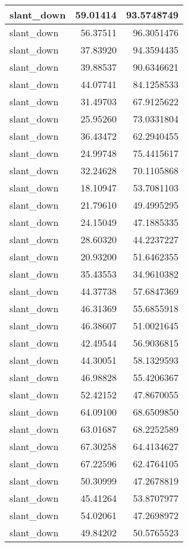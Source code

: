 \documentclass[
]{book}
\theoremstyle{definition}
\theoremstyle{definition}
\theoremstyle{definition}
\theoremstyle{definition}
\theoremstyle{remark}
\begin{document}
\begin{tabular}{l|r|r}
\hline
slant\_down & 59.01414 & 93.5748749\\
\hline
slant\_down & 56.37511 & 96.3051476\\
\hline
slant\_down & 37.83920 & 94.3594435\\
\hline
slant\_down & 39.88537 & 90.6346621\\
\hline
slant\_down & 44.07741 & 84.1258533\\
\hline
slant\_down & 31.49703 & 67.9125622\\
\hline
slant\_down & 25.95260 & 73.0331804\\
\hline
slant\_down & 36.43472 & 62.2940455\\
\hline
slant\_down & 24.99748 & 75.4415617\\
\hline
slant\_down & 32.24628 & 70.1105868\\
\hline
slant\_down & 18.10947 & 53.7081103\\
\hline
slant\_down & 21.79610 & 49.4995295\\
\hline
slant\_down & 24.15049 & 47.1885335\\
\hline
slant\_down & 28.60320 & 44.2237227\\
\hline
slant\_down & 20.93200 & 51.6462355\\
\hline
slant\_down & 35.43553 & 34.9610382\\
\hline
slant\_down & 44.37738 & 57.6847369\\
\hline
slant\_down & 46.31369 & 55.6855918\\
\hline
slant\_down & 46.38607 & 51.0021645\\
\hline
slant\_down & 42.49544 & 56.9036815\\
\hline
slant\_down & 44.30051 & 58.1329593\\
\hline
slant\_down & 46.98828 & 55.4206367\\
\hline
slant\_down & 52.42152 & 47.8670055\\
\hline
slant\_down & 64.09100 & 68.6509850\\
\hline
slant\_down & 63.01687 & 68.2252589\\
\hline
slant\_down & 67.30258 & 64.4134627\\
\hline
slant\_down & 67.22596 & 62.4764105\\
\hline
slant\_down & 50.30999 & 47.2678819\\
\hline
slant\_down & 45.41264 & 53.8707977\\
\hline
slant\_down & 54.02061 & 47.2698972\\
\hline
slant\_down & 49.84202 & 50.5765523\\

\end{tabular}
\end{document}
